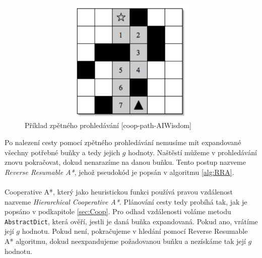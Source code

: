 \begin{figure}[htb]
	\begin{center}
		\includegraphics*[width=15cm,height=6cm,keepaspectratio]{obr/backwardsSearch}
	\end{center}
	\caption[caption]{Příklad zpětného prohledávání [coop-path-AIWisdom]}
	\label{obr:backwardsSearch}
\end{figure}

Po nalezení cesty pomocí zpětného prohledávání nemusíme mít expandované všechny potřebné buňky a tedy jejich $g$ hodnoty. Naštěstí můžeme v prohledávání znovu pokračovat, dokud nenarazíme na danou buňku. Tento postup nazveme \emph{Reverse Resumable A*}, jehož pseudokód je popsán v algoritmu \ref{alg:RRA}.
\\
\\ %
Cooperative A*, který jako heuristickou funkci používá pravou vzdálenost nazveme \emph{Hierarchical Cooperative A*}. Plánování cesty tedy probíhá tak, jak je popsáno v podkapitole \ref{sec:Coop}. Pro odhad vzdálenosti voláme metodu \texttt{AbstractDict}, která ověří, jestli je daná buňka expandovaná. Pokud ano, vrátíme její $g$ hodnotu. Pokud není, pokračujeme v hledání pomocí Reverse Resumable A* algoritmu, dokud neexpandujeme požadovanou buňku a nezískáme tak její $g$ hodnotu.

